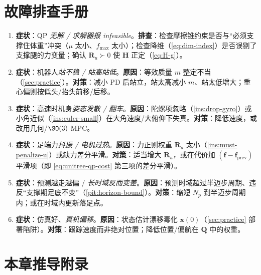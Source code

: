 \section*{故障排查手册}
\begin{enumerate}
  \item \textbf{症状}：QP \emph{无解 / 求解器报 infeasible}。\textbf{排查}：检查摩擦锥约束是否与“必须支撑住体重”冲突（$\mu$ 太小、$f_{\max}$ 太小）；检查降维（\cref{eq:dim-index}）是否误剔了支撑腿的力变量；确认 $\mathbf{R}_u\succ0$ 使 $\mathbf{H}$ 正定（\cref{eq:H-g}）。
  \item \textbf{症状}：机器人\emph{站不稳 / 站高站低}。\textbf{原因}：等效质量 $m$ 整定不当（\cref{sec:practice}）。\textbf{对策}：减小 PD 后站立，站太高减小 $m$、站太低增大；重心偏则按低头/抬头前移/后移。
  \item \textbf{症状}：高速时机身\emph{姿态发散 / 翻车}。\textbf{原因}：陀螺项忽略（\cref{ins:drop-gyro}）或小角近似（\cref{ins:euler-small}）在大角速度/大俯仰下失真。\textbf{对策}：降低速度，或改用几何/$\SO(3)$ MPC\cite{ding2021repfree}。
  \item \textbf{症状}：足端力\emph{抖振 / 电机过热}。\textbf{原因}：力正则权重 $\mathbf{R}_u$ 太小（\cref{ins:must-penalize-u}）或缺力差分平滑。\textbf{对策}：适当增大 $\mathbf{R}_u$，或在代价加 $(\mathbf{f}-\mathbf{f}_{\text{prev}})$ 平滑项（即 \cref{eq:unitree-qp-cost} 第三项的差分平滑）。
  \item \textbf{症状}：预测越走越偏 / \emph{长时域反而变差}。\textbf{原因}：预测时域超过半迈步周期、违反“支撑期足底不变”（\cref{pit:horizon-bound}）。\textbf{对策}：缩短 $N_p$ 到半迈步周期内；或在时域内更新落足点。
  \item \textbf{症状}：仿真好、\emph{真机偏移}。\textbf{原因}：状态估计漂移毒化 $\boldsymbol{x}(0)$（\cref{sec:practice} 部署陷阱）。\textbf{对策}：跟踪速度而非绝对位置；降低位置/偏航在 $\mathbf{Q}$ 中的权重。
\end{enumerate}

\section{本章推导附录}
\label{sec:appendix-deriv}

